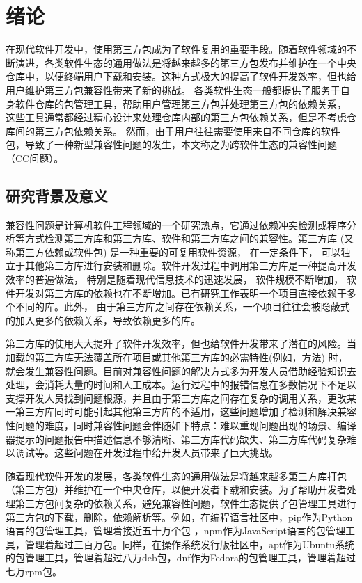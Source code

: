 \chapter{绪论}
在现代软件开发中，使用第三方包成为了软件复用的重要手段。随着软件领域的不断演进，各类软件生态的通用做法是将越来越多的第三方包发布并维护在一个中央仓库中，以便终端用户下载和安装。这种方式极大的提高了软件开发效率，但也给用户维护第三方包兼容性带来了新的挑战。
各类软件生态一般都提供了服务于自身软件仓库的包管理工具，帮助用户管理第三方包并处理第三方包的依赖关系，
这些工具通常都经过精心设计来处理仓库内部的第三方包依赖关系，但是不考虑仓库间的第三方包依赖关系。
然而，由于用户往往需要使用来自不同仓库的软件包，导致了一种新型兼容性问题的发生，本文称之为跨软件生态的兼容性问题（CC问题）。

\section{研究背景及意义}
兼容性问题是计算机软件工程领域的一个研究热点，它通过依赖冲突检测或程序分析等方式检测第三方库和第三方库、软件和第三方库之间的兼容性。第三方库 (又称第三方依赖或软件包) 是一种重要的可复用软件资源， 在一定条件下， 可以独立于其他第三方库进行安装和删除。软件开发过程中调用第三方库是一种提高开发效率的普遍做法， 特别是随着现代信息技术的迅速发展， 软件规模不断增加， 软件开发对第三方库的依赖也在不断增加。已有研究工作表明一个项目直接依赖于多个不同的库。此外， 由于第三方库之间存在依赖关系，一个项目往往会被隐蔽式的加入更多的依赖关系，导致依赖更多的库。

第三方库的使用大大提升了软件开发效率，但也给软件开发带来了潜在的风险。当加载的第三方库无法覆盖所在项目或其他第三方库的必需特性(例如，方法) 时，就会发生兼容性问题。目前对兼容性问题的解决方式多为开发人员借助经验知识去处理，会消耗大量的时间和人工成本。运行过程中的报错信息在多数情况下不足以支撑开发人员找到问题根源，并且由于第三方库之间存在复杂的调用关系，更改某一第三方库同时可能引起其他第三方库的不适用，这些问题增加了检测和解决兼容性问题的难度，同时兼容性问题会伴随如下特点：难以重现问题出现的场景、编译器提示的问题报告中描述信息不够清晰、第三方库代码缺失、第三方库代码复杂难以调试等。这些问题在开发过程中给开发人员带来了巨大挑战。

随着现代软件开发的发展，各类软件生态的通用做法是将越来越多第三方库打包（第三方包）并维护在一个中央仓库，以便开发者下载和安装。为了帮助开发者处理第三方包间复杂的依赖关系，避免兼容性问题，软件生态提供了包管理工具进行第三方包的下载，删除，依赖解析等。例如，在编程语言社区中，pip作为Python语言的包管理工具，管理着接近五十万个包 ，npm作为JavaScript语言的包管理工具，管理着超过三百万包。同样，在操作系统发行版社区中，apt作为Ubuntu系统的包管理工具，管理着超过八万deb包，dnf作为Fedora的包管理工具，管理着超过七万rpm包。

